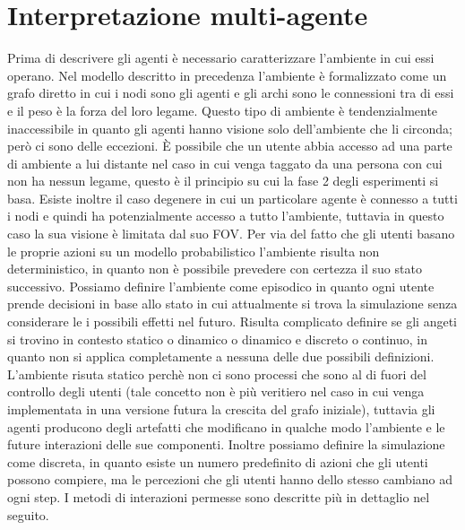 \documentclass[a4paper,12pt]{article}
\begin{document}
\section{Interpretazione multi-agente}
\label{sec:mas}
Prima di descrivere gli agenti \`e necessario caratterizzare l'ambiente in cui essi operano.
Nel modello descritto in precedenza l'ambiente \`e formalizzato come un grafo diretto in cui i nodi sono gli agenti e gli archi sono le connessioni tra di essi e il peso \`e la forza del loro legame.
Questo tipo di ambiente \`e tendenzialmente inaccessibile in quanto gli agenti hanno visione solo dell'ambiente che li circonda; per\`o ci sono delle eccezioni. \`E possibile che un utente abbia accesso ad una parte di ambiente a lui distante nel caso in cui venga taggato da una persona con cui non ha nessun legame, questo \`e il principio su cui la fase 2 degli esperimenti si basa. Esiste inoltre il caso degenere in cui un particolare agente \`e connesso a tutti i nodi e quindi ha potenzialmente accesso a tutto l'ambiente, tuttavia in questo caso la sua visione \`e limitata dal suo FOV. Per via del fatto che gli utenti basano le proprie azioni su un modello probabilistico l'ambiente risulta non deterministico, in quanto non \`e possibile prevedere con certezza il suo stato successivo. Possiamo definire l'ambiente come episodico in quanto ogni utente prende decisioni in base allo stato in cui attualmente si trova la simulazione senza considerare le i possibili effetti nel futuro. Risulta complicato definire se gli angeti si trovino in contesto statico o dinamico o dinamico e discreto o continuo, in quanto non si applica completamente a nessuna delle due possibili definizioni. L'ambiente risuta statico perch\`e non ci sono processi che sono al di fuori del controllo degli utenti (tale concetto non \`e pi\`u veritiero nel caso in cui venga implementata in una versione futura la crescita del grafo iniziale), tuttavia gli agenti producono degli artefatti che modificano in qualche modo l'ambiente e le future interazioni delle sue componenti.
Inoltre possiamo definire la simulazione come discreta, in quanto esiste un numero predefinito di azioni che gli utenti possono compiere, ma le percezioni che gli utenti hanno dello stesso cambiano ad ogni step. I metodi di interazioni permesse sono descritte pi\`u in dettaglio nel seguito.
\end{document}
